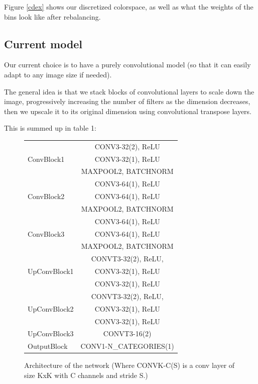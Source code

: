 \documentclass[10pt,twocolumn,letterpaper]{article}
\begin{document}
Figure \ref{cdex} shows our discretized colorspace, as well as what the weights of the bins look like after rebalancing.


\subsection{Current model}

Our current choice is to have a purely convolutional model (so that it can easily adapt to any image size if needed).

The general idea is that we stack blocks of convolutional layers to scale down the image, progressively increasing the number of filters as the dimension decreases, then we upscale it to its original dimension using convolutional transpose layers.

This is summed up in table 1:


\begin{figure}
\begin{center}
 \begin{tabular}{||l |c||}
 \hline
 \multirow{3}{60pt}{ConvBlock1}&CONV3-32(2), ReLU\\
    &CONV3-32(1), ReLU\\
    & MAXPOOL2, BATCHNORM \\
 \hline
  \multirow{3}{60pt}{ConvBlock2}&CONV3-64(1), ReLU\\
    &CONV3-64(1), ReLU\\
    & MAXPOOL2, BATCHNORM \\
 \hline
   \multirow{3}{60pt}{ConvBlock3}&CONV3-64(1), ReLU\\
    &CONV3-64(1), ReLU\\
    & MAXPOOL2, BATCHNORM \\
 \hline
    \multirow{3}{60pt}{UpConvBlock1}&CONVT3-32(2), ReLU,\\
    &CONV3-32(1), ReLU\\
    & CONV3-32(1), ReLU \\
 \hline
    \multirow{3}{60pt}{UpConvBlock2}&CONVT3-32(2), ReLU,\\
    &CONV3-32(1), ReLU\\
    & CONV3-32(1), ReLU \\
 \hline
 UpConvBlock3 & CONVT3-16(2)\\
 \hline
 OutputBlock & CONV1-N\_CATEGORIES(1)\\
 \hline
\end{tabular}
\end{center}
\caption{Architecture of the network (Where CONVK-C(S) is a conv layer of size KxK with C channels and stride S.)}
\end{figure}
\end{document}
